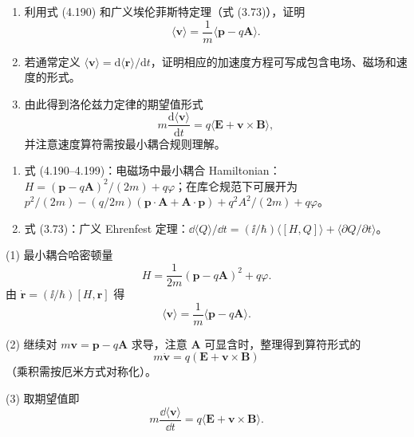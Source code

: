 \begin{question}
\begin{enumerate}
\item 利用式 (4.190) 和广义埃伦菲斯特定理（式 (3.73)），证明
\[
\langle\mathbf v\rangle=\frac1m\langle \mathbf p-q\mathbf A\rangle.
\]
\item 若通常定义 $\langle\mathbf v\rangle=\mathrm d\langle\mathbf r\rangle/\mathrm dt$，证明相应的加速度方程可写成包含电场、磁场和速度的形式。
\item 由此得到洛伦兹力定律的期望值形式
\[
m\frac{\mathrm d\langle\mathbf v\rangle}{\mathrm dt}=q\langle\mathbf E+\mathbf v\times\mathbf B\rangle,
\]
并注意速度算符需按最小耦合规则理解。
\end{enumerate}

\par\smallskip
{}
\begin{enumerate}[leftmargin=2.2em,itemsep=0.12em,topsep=0.12em,parsep=0pt]
\item 式 (4.190--4.199)：电磁场中最小耦合 Hamiltonian：$H=(\mathbf p-q\mathbf A)^2/(2m)+q\varphi$；在库仑规范下可展开为 $p^2/(2m)-(q/2m)(\mathbf p\cdot\mathbf A+\mathbf A\cdot\mathbf p)+q^2A^2/(2m)+q\varphi$。
\item 式 (3.73)：广义 Ehrenfest 定理：$\dd\langle Q\rangle/\dd t=(\ii/\hbar)\langle[H,Q]\rangle+\langle\partial Q/\partial t\rangle$。
\end{enumerate}

\end{question}
\begin{solution}

(1) 最小耦合哈密顿量
\[
H=\frac{1}{2m}(\mathbf p-q\mathbf A)^2+q\varphi.
\]
由 $\dot{\mathbf r}=(\ii/\hbar)[H,\mathbf r]$ 得
\[
\langle\mathbf v\rangle=\frac{1}{m}\langle\mathbf p-q\mathbf A\rangle.
\]

(2) 继续对 $m\mathbf v=\mathbf p-q\mathbf A$ 求导，注意 $\mathbf A$ 可显含时，整理得到算符形式的
\[
m\dot{\mathbf v}=q(\mathbf E+\mathbf v\times\mathbf B)
\]
（乘积需按厄米方式对称化）。

(3) 取期望值即
\[
m\frac{\dd\langle\mathbf v\rangle}{\dd t}=q\langle\mathbf E+\mathbf v\times\mathbf B\rangle.
\]

\end{solution}


